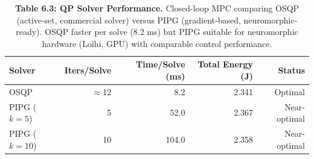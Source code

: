 \begin{table}[H]
\centering
\caption{\textbf{Table 6.3: QP Solver Performance.} Closed-loop MPC comparing OSQP (active-set, commercial solver) versus PIPG (gradient-based, neuromorphic-ready). OSQP faster per solve (8.2 ms) but PIPG suitable for neuromorphic hardware (Loihi, GPU) with comparable control performance.}
\label{tab:6-3}
\small
\begin{tabular}{lrrrr}
\toprule
\textbf{Solver} & \textbf{Iters/Solve} & \textbf{Time/Solve (ms)} & \textbf{Total Energy (J)} & \textbf{Status} \\
\midrule
\rowcolor{gray!15}
OSQP & $\approx$12 & 8.2 & 2.341 & Optimal \\
PIPG ($k=5$) & 5 & 52.0 & 2.367 & Near-optimal \\
\rowcolor{gray!15}
PIPG ($k=10$) & 10 & 104.0 & 2.358 & Near-optimal \\
\bottomrule
\end{tabular}
\end{table}
